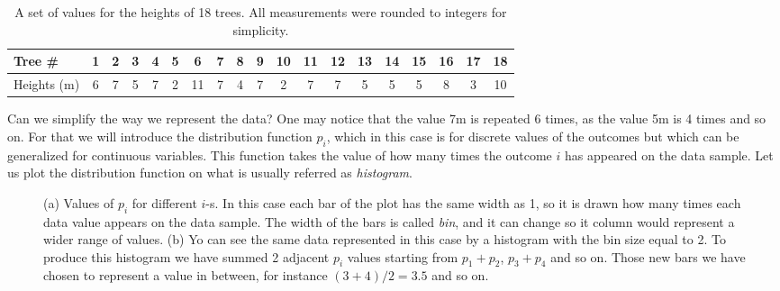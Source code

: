 \begin{table}
\begin{center}
\begin{tabular}{| l | c | c | c | c | c | c | c | c | c | c | c | c | c | c | c | c | c | c | }
  \hline
  Tree \# & 1 & 2 & 3 & 4 & 5 & 6 & 7 & 8 & 9 & 10 &  11 &  12 &  13 &  14 &  15 &  16 &  17 &  18
  \\ \hline
  Heights (m) & 6 &  7 &  5 &  7 &  2 & 11 &  7 &  4 &  7 &  2 &  7 &  7 &  5 &  5 &  5 &  8 &  3 & 10 \\ \hline
\end{tabular}
\end{center}
\caption{A set of values for the heights of 18 trees. All measurements were rounded to integers for simplicity.}
\end{table}

Can we simplify the way we represent the data?
One may notice that the value 7m is repeated 6 times, as the value 5m is 4 times and so on.
For that we will introduce the distribution function $p_i$, which in this case is for discrete values of the outcomes but which can be generalized for continuous variables.
This function takes the value of how many times the outcome $i$ has appeared on the data sample.
Let us plot the distribution function on what is usually referred as \emph{histogram}.

\begin{figure}
  \centering
  \hfill
  \caption{\baselineskip=14pt (a) Values of $p_i$ for different $i$-s. In this case each bar of the plot has the same width as 1, so it is drawn how many times each data value appears on the data sample.
  The width of the bars is called \emph{bin}, and it can change so it column would represent a wider range of values. (b) Yo can see the same data represented in this case by a histogram with the bin size equal to 2. To produce this histogram we have summed 2 adjacent $p_i$ values starting from $p_1+p_2$, $p_3+p_4$ and so on.
  Those new bars we have chosen to represent a value in between, for instance $(3+4)/2=3.5$ and so on.}
\end{figure}

